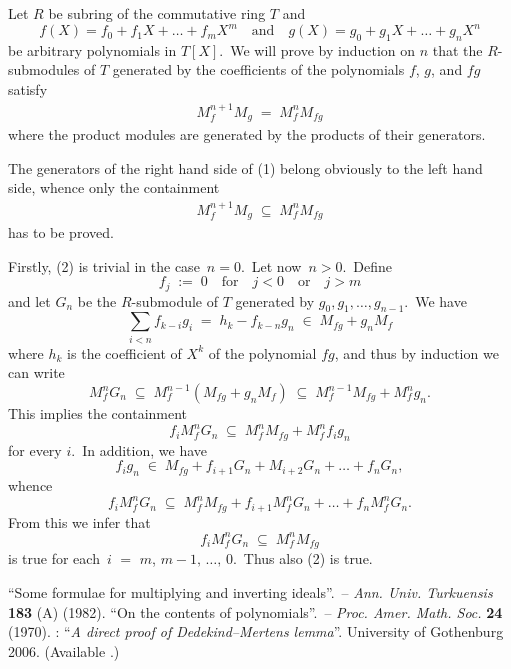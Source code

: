 \documentclass[12pt]{article}
\begin{document}
Let $R$ be subring of the commutative ring $T$ and
$$f(X) = f_0+f_1X+\ldots+f_mX^m \quad \mbox{and} \quad 
  g(X) = g_0+g_1X+\ldots+g_nX^n$$
be arbitrary polynomials in $T[X]$.\, We will prove by induction on $n$ that the $R$-submodules of $T$ generated by the 
coefficients of the polynomials $f$, $g$, and $fg$ satisfy
\begin{align}
M_f^{n+1}M_g \;=\; M_f^nM_{fg}
\end{align}
where the product modules are generated by the products of their generators.

The generators of the right hand side of (1) belong obviously to the left hand side, 
whence only the containment
\begin{align}
M_f^{n+1}M_g \;\subseteq\; M_f^nM_{fg}
\end{align}
has to be proved.\, 

Firstly, (2) is trivial in the case\, $n =0$.\, Let now\, $n
> 0$.\, Define 
$$f_j \;:=\; 0 \quad\mbox{for}\quad j < 0 
\quad\mbox{or}\quad j > m$$
and let $G_n$ be the $R$-submodule of $T$ generated by $g_0,g_1,\ldots,g_{n-1}$.\, We have
$$\sum_{i<n}f_{k-i}g_i \;=\; h_k-f_{k-n}g_n \;\in\; M_{fg}+g_nM_f$$
where $h_k$ is the coefficient of $X^k$ of the polynomial $fg$, and thus by induction we 
can write
$$M_f^nG_n \;\subseteq\; M_f^{n-1}(M_{fg}+g_nM_f) 
\;\subseteq\; M_f^{n-1}M_{fg}+M_f^ng_n.$$
This implies the containment
$$f_iM_f^nG_n \;\subseteq\; M_f^nM_{fg}+M_f^nf_ig_n$$
for every $i$.\, In addition, we have
$$f_ig_n \;\in\; M_{fg}+f_{i+1}G_n+M_{i+2}G_n+\ldots+f_nG_n,$$
whence
$$f_iM_{f}^nG_n \;\subseteq\; 
M_f^nM_{fg}+f_{i+1}M_f^nG_n+\ldots+f_nM_f^nG_n.$$
From this we infer that
$$f_iM_f^nG_n \;\subseteq\; M_f^nM_{fg}$$
is true for each\, $i$ $=$ $m$, $m\!-\!1,\,\ldots,\,0$.\, Thus also (2) is true.\\

\begin{thebibliography}{9}
  ``{Some formulae for multiplying and inverting ideals}''. \,-- {\em Ann. Univ. Turkuensis} \textbf{183} (A) (1982).
  ``{On the contents of polynomials}''. \,-- {\em Proc. Amer. Math. Soc.} \textbf{24} (1970).
 : ``{\it A direct proof of 
 Dedekind--Mertens lemma}''. University of Gothenburg 2006. (Available 
 .) 
\end{thebibliography}
\end{document}
